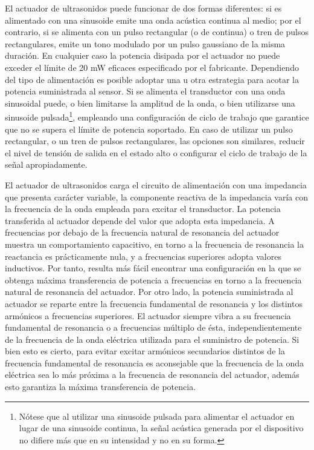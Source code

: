 El actuador de ultrasonidos puede funcionar de dos formas diferentes: si es
alimentado con una sinusoide emite una onda acústica continua al medio; por
el contrario, si se alimenta con un pulso rectangular (o de continua) o
tren de pulsos rectangulares, emite un tono modulado por un pulso gaussiano
de la misma duración. En cualquier caso la potencia disipada por el
actuador no puede exceder el límite de 20 mW eficaces especificado por el
fabricante. Dependiendo del tipo de alimentación es posible adoptar una u
otra estrategia para acotar la potencia suministrada al sensor. Si se
alimenta el transductor con una onda sinusoidal puede, o bien limitarse la
amplitud de la onda, o bien utilizarse una sinusoide
pulsada\footnote{Nótese que al utilizar una sinusoide pulsada para
alimentar el actuador en lugar de una sinusoide continua, la señal acústica
generada por el dispositivo no difiere más que en su intensidad y no en su
forma.}, empleando una configuración de ciclo de trabajo que garantice que
no se supera el límite de potencia soportado. En caso de utilizar un pulso
rectangular, o un tren de pulsos rectangulares, las opciones son similares,
reducir el nivel de tensión de salida en el estado alto o configurar el
ciclo de trabajo de la señal apropiadamente.

El actuador de ultrasonidos carga el circuito de alimentación con una
impedancia que presenta carácter variable, la componente reactiva de la
impedancia varía con la frecuencia de la onda empleada para excitar el
transductor. La potencia transferida al actuador depende del valor que
adopta esta impedancia. A frecuencias por debajo de la frecuencia natural
de resonancia del actuador muestra un comportamiento capacitivo, en torno a
la frecuencia de resonancia la reactancia es prácticamente nula, y a
frecuencias superiores adopta valores inductivos. Por tanto, resulta más
fácil encontrar una configuración en la que se obtenga máxima transferencia
de potencia a frecuencias en torno a la frecuencia natural de resonancia
del actuador. Por otro lado, la potencia suministrada al actuador se
reparte entre la frecuencia fundamental de resonancia y los distintos
armónicos a frecuencias superiores. El actuador siempre vibra a su
frecuencia fundamental de resonancia o a frecuencias múltiplo de ésta,
independientemente de la frecuencia de la onda eléctrica utilizada para el
suministro de potencia. Si bien esto es cierto, para evitar excitar
armónicos secundarios distintos de la frecuencia fundamental de resonancia
es aconsejable que la frecuencia de la onda eléctrica sea lo más próxima a
la frecuencia de resonancia del actuador, además esto garantiza la máxima
transferencia de potencia.

